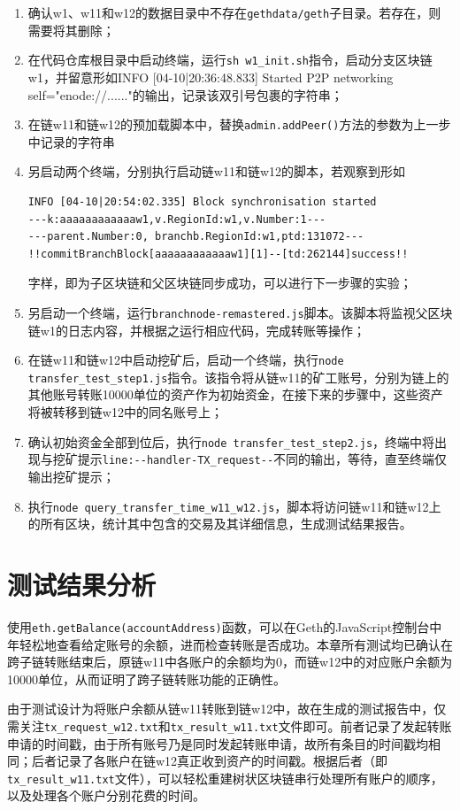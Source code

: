 \begin{enumerate}
    \item 确认w1、w11和w12的数据目录中不存在\verb|gethdata/geth|子目录。若存在，则需要将其删除；
    \item 在代码仓库根目录中启动终端，运行\verb|sh w1_init.sh|指令，启动分支区块链w1，并留意形如INFO [04-10|20:36:48.833] Started P2P networking self="enode://......"的输出，记录该双引号包裹的字符串；
    \item 在链w11和链w12的预加载脚本中，替换\verb|admin.addPeer()|方法的参数为上一步中记录的字符串
    \item 另启动两个终端，分别执行启动链w11和链w12的脚本，若观察到形如\begin{verbatim}
INFO [04-10|20:54:02.335] Block synchronisation started
---k:aaaaaaaaaaaaw1,v.RegionId:w1,v.Number:1---
---parent.Number:0, branchb.RegionId:w1,ptd:131072---
!!commitBranchBlock[aaaaaaaaaaaaw1][1]--[td:262144]success!!
    \end{verbatim}
          字样，即为子区块链和父区块链同步成功，可以进行下一步骤的实验；
    \item 另启动一个终端，运行\verb|branchnode-remastered.js|脚本。该脚本将监视父区块链w1的日志内容，并根据之运行相应代码，完成转账等操作；
    \item 在链w11和链w12中启动挖矿后，启动一个终端，执行\verb|node transfer_test_step1.js|指令。该指令将从链w11的矿工账号，分别为链上的其他账号转账10000单位的资产作为初始资金，在接下来的步骤中，这些资产将被转移到链w12中的同名账号上；
    \item 确认初始资金全部到位后，执行\verb|node transfer_test_step2.js|，终端中将出现与挖矿提示\verb|line:--handler-TX_request--|不同的输出，等待，直至终端仅输出挖矿提示；
    \item 执行\verb|node query_transfer_time_w11_w12.js|，脚本将访问链w11和链w12上的所有区块，统计其中包含的交易及其详细信息，生成测试结果报告。
\end{enumerate}

\section{测试结果分析}

使用\verb|eth.getBalance(accountAddress)|函数，可以在Geth的JavaScript控制台中年轻松地查看给定账号的余额，进而检查转账是否成功。本章所有测试均已确认在跨子链转账结束后，原链w11中各账户的余额均为0，而链w12中的对应账户余额为10000单位，从而证明了跨子链转账功能的正确性。

由于测试设计为将账户余额从链w11转账到链w12中，故在生成的测试报告中，仅需关注\verb|tx_request_w12.txt|和\verb|tx_result_w11.txt|文件即可。前者记录了发起转账申请的时间戳，由于所有账号乃是同时发起转账申请，故所有条目的时间戳均相同；后者记录了各账户在链w12真正收到资产的时间戳。根据后者（即\verb|tx_result_w11.txt|文件），可以轻松重建树状区块链串行处理所有账户的顺序，以及处理各个账户分别花费的时间。

